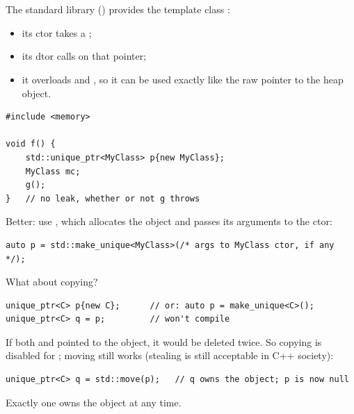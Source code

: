 \section{}
The standard library () provides the template class
:
\begin{itemize}
  \item its ctor takes a ;
  \item its dtor calls  on that pointer;
  \item it overloads \code{*} and \code{->}, so it can be used exactly like
        the raw pointer to the heap object.
\end{itemize}
\begin{lstlisting}[style=cpp]
#include <memory>

void f() {
    std::unique_ptr<MyClass> p{new MyClass};
    MyClass mc;
    g();
}   // no leak, whether or not g throws
\end{lstlisting}
Better: use , which allocates the object and passes its
arguments to the  ctor:
\begin{lstlisting}[style=cpp]
auto p = std::make_unique<MyClass>(/* args to MyClass ctor, if any */);
\end{lstlisting}

What about copying?
\begin{lstlisting}[style=cpp]
unique_ptr<C> p{new C};      // or: auto p = make_unique<C>();
unique_ptr<C> q = p;         // won't compile
\end{lstlisting}
If both  and  pointed to the object, it would be deleted twice.
So copying is disabled for ; moving still works (stealing is
still acceptable in C++ society):
\begin{lstlisting}[style=cpp]
unique_ptr<C> q = std::move(p);   // q owns the object; p is now null
\end{lstlisting}
\begin{center}

\small Exactly one  owns the object at any time.
\end{center}

